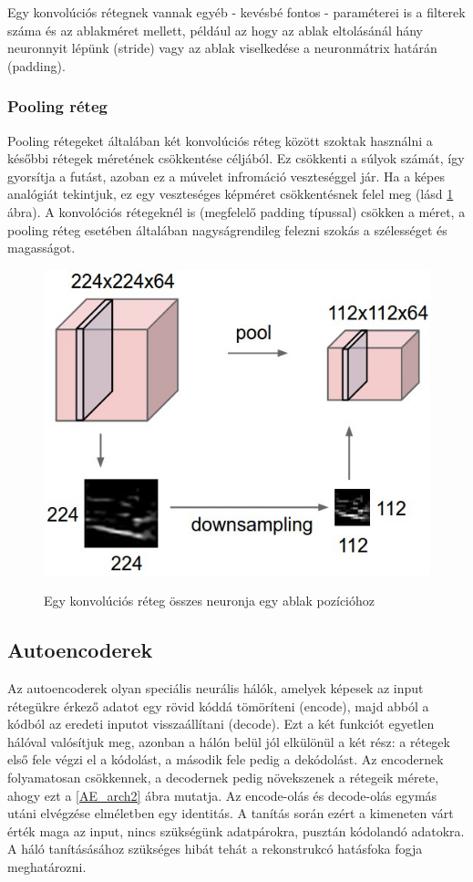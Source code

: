 \documentclass[12pt]{article}
\begin{document}
Egy konvolúciós rétegnek vannak egyéb - kevésbé fontos - paraméterei is a filterek száma és az ablakméret mellett, például az hogy az ablak eltolásánál hány neuronnyit lépünk (stride) vagy az ablak viselkedése a neuronmátrix határán (padding).

\subsubsection{Pooling réteg}

Pooling rétegeket általában két konvolúciós réteg között szoktak használni a későbbi rétegek méretének csökkentése céljából. Ez csökkenti a súlyok számát, így gyorsítja a futást, azoban ez a múvelet infromáció veszteséggel jár. Ha a képes analógiát tekintjuk, ez egy veszteséges képméret csökkentésnek felel meg (lásd \ref{pool} ábra). A konvolóciós rétegeknél is (megfelelő padding típussal) csökken a méret, a pooling réteg esetében általában nagyságrendileg felezni szokás a szélességet és magasságot.

\begin{figure}[h!]
\begin{center}
  \label{pool}
  \includegraphics[width=0.5\linewidth]{pool.jpeg}
  \caption{Egy konvolúciós réteg összes neuronja egy ablak pozícióhoz}
\end{center}
\end{figure}

\subsection{Autoencoderek}

Az autoencoderek olyan speciális neurális hálók, amelyek képesek az input rétegükre érkező adatot egy rövid kóddá tömöríteni (encode), majd abból a kódból az eredeti inputot visszaállítani (decode). Ezt a két funkciót egyetlen hálóval valósítjuk meg, azonban a hálón belül jól elkülönül a két rész: a rétegek első fele végzi el a kódolást, a második fele pedig a dekódolást. Az encodernek folyamatosan csökkennek, a decodernek pedig növekszenek a rétegeik mérete, ahogy ezt a \ref{AE_arch2} ábra mutatja. Az encode-olás és decode-olás egymás utáni elvégzése elméletben egy identitás. A tanítás során ezért a kimeneten várt érték maga az input, nincs szükségünk adatpárokra, pusztán kódolandó adatokra. A háló tanításásához szükséges hibát tehát a rekonstrukcó hatásfoka fogja meghatározni.
\end{document}
